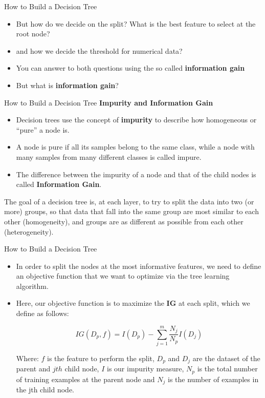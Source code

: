 \documentclass[11pt]{beamer}
\begin{document}
%
%
\begin{frame}{How to Build a Decision Tree}
	\begin{itemize}
	
 \item But how do we decide on the split? What is the best feature to select at the root node?
 \item and how we decide the threshold for numerical data?
		\item You can answer to both questions using the so called \textbf{information gain}
		\item But what is \textbf{information gain}?
	\end{itemize}
\end{frame}
%
%
\begin{frame}{How to Build a Decision Tree}
\textbf{Impurity and Information Gain}
	\begin{itemize}
\item Decision trees use the concept of \textbf{impurity} to describe how homogeneous or “pure” a node is. 

\item A node is pure if all its samples belong to the same class, while a node with many samples from many different classes is called impure. 

\item The difference between the impurity of a node and that of the child nodes is called \textbf{Information Gain}. 
\end{itemize}

\vspace{.5cm}
The goal of a decision tree is, at each layer, to try to split the data into two (or more) groups, so that data that fall into the same group are most similar to each other (homogeneity), and groups are as different as possible from each other (heterogeneity).
\end{frame}
%
%
\begin{frame}{How to Build a Decision Tree}
\begin{itemize}
\item In order to split the nodes at the most informative features, we need to define an
objective function that we want to optimize via the tree learning algorithm. 

\item Here,
our objective function is to maximize the \textbf{IG} at each split, which we define as follows:

\begin{equation}
IG(D_p, f) = I(D_p) - \sum\limits_{j=1}^m \frac{N_j}{N_p} I(D_j)
\end{equation}

Where: $f$ is the feature to perform the split, $D_p$ and $D_j$ are the dataset of the parent and $jth$ child node, $I$ is our impurity measure, 
$N_p$ is the total number of training examples at the parent node and $N_j$ is the number of examples in the jth child node. 

\end{itemize}
\end{frame}
\end{document}

